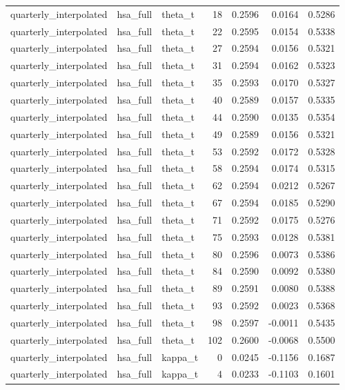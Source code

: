 \begin{tabular}{lllrrrr}
quarterly\_interpolated & hsa\_full & theta\_t & 18 & 0.2596 & 0.0164 & 0.5286 \\
quarterly\_interpolated & hsa\_full & theta\_t & 22 & 0.2595 & 0.0154 & 0.5338 \\
quarterly\_interpolated & hsa\_full & theta\_t & 27 & 0.2594 & 0.0156 & 0.5321 \\
quarterly\_interpolated & hsa\_full & theta\_t & 31 & 0.2594 & 0.0162 & 0.5323 \\
quarterly\_interpolated & hsa\_full & theta\_t & 35 & 0.2593 & 0.0170 & 0.5327 \\
quarterly\_interpolated & hsa\_full & theta\_t & 40 & 0.2589 & 0.0157 & 0.5335 \\
quarterly\_interpolated & hsa\_full & theta\_t & 44 & 0.2590 & 0.0135 & 0.5354 \\
quarterly\_interpolated & hsa\_full & theta\_t & 49 & 0.2589 & 0.0156 & 0.5321 \\
quarterly\_interpolated & hsa\_full & theta\_t & 53 & 0.2592 & 0.0172 & 0.5328 \\
quarterly\_interpolated & hsa\_full & theta\_t & 58 & 0.2594 & 0.0174 & 0.5315 \\
quarterly\_interpolated & hsa\_full & theta\_t & 62 & 0.2594 & 0.0212 & 0.5267 \\
quarterly\_interpolated & hsa\_full & theta\_t & 67 & 0.2594 & 0.0185 & 0.5290 \\
quarterly\_interpolated & hsa\_full & theta\_t & 71 & 0.2592 & 0.0175 & 0.5276 \\
quarterly\_interpolated & hsa\_full & theta\_t & 75 & 0.2593 & 0.0128 & 0.5381 \\
quarterly\_interpolated & hsa\_full & theta\_t & 80 & 0.2596 & 0.0073 & 0.5386 \\
quarterly\_interpolated & hsa\_full & theta\_t & 84 & 0.2590 & 0.0092 & 0.5380 \\
quarterly\_interpolated & hsa\_full & theta\_t & 89 & 0.2591 & 0.0080 & 0.5388 \\
quarterly\_interpolated & hsa\_full & theta\_t & 93 & 0.2592 & 0.0023 & 0.5368 \\
quarterly\_interpolated & hsa\_full & theta\_t & 98 & 0.2597 & -0.0011 & 0.5435 \\
quarterly\_interpolated & hsa\_full & theta\_t & 102 & 0.2600 & -0.0068 & 0.5500 \\
quarterly\_interpolated & hsa\_full & kappa\_t & 0 & 0.0245 & -0.1156 & 0.1687 \\
quarterly\_interpolated & hsa\_full & kappa\_t & 4 & 0.0233 & -0.1103 & 0.1601 \\

\end{tabular}

